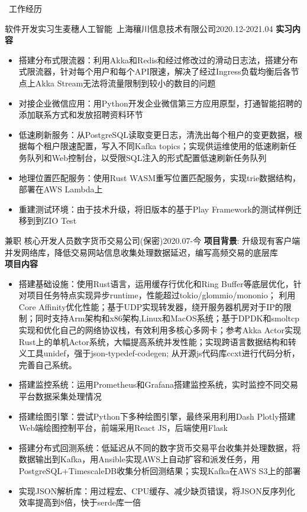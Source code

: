 \documentclass[UTF8]{resume}
\begin{document}
\begin{rSection}{\faBriefcase~工作经历}
    \begin{rExperience}{软件开发实习生}{麦穗人工智能~上海穰川信息技术有限公司}{2020.12-2021.04}
        \textbf{实习内容}
        \begin{itemize}
            \itemsep -0.5em \vspace{-0.5em}
            \item 搭建分布式限流器：利用Akka和Redis和经过修改过的滑动日志法，搭建分布式限流器，针对每个用户和每个API限速，解决了经过Ingress负载均衡后各节点上Akka Stream无法将流量限制到较小的数目的问题
            \item 对接企业微信应用：用Python开发企业微信第三方应用原型，打通智能招聘的添加联系方式和发放招聘资料环节
            \item 低速刷新服务：从PostgreSQL读取变更日志，清洗出每个租户的变更数据，根据每个租户限速配置，写入不同Kafka topics；实现供运维使用的低速刷新任务队列和Web控制台，以受限SQL注入的形式配置低速刷新任务队列
            \item 地理位置匹配服务：使用Rust WASM重写位置匹配服务，实现trie数据结构，部署在AWS Lambda上
            \item 重建测试环境：由于技术升级，将旧版本的基于Play Framework的测试样例迁移到到ZIO Test
        \end{itemize}
    \end{rExperience}
    \begin{rExperience}{兼职 核心开发人员}{数字货币交易公司(保密)}{2020.07-今}
        \textbf{项目背景}:
        升级现有客户端并发网络库，降低交易网站信息收集处理数据延迟，编写高频交易的底层库\\
        \textbf{项目内容}
        \begin{itemize}
            \itemsep -0.5em \vspace{-0.5em}
            \item 搭建基础设施：使用Rust语言，运用缓存行优化和Ring Buffer等底层优化，针对项目任务特点实现异步runtime，性能超过tokio/glommio/mononio； 利用Core Affinity优化性能；基于UDP实现转发器，绕开服务器机房对于IP的限制；同时支持Arm架构和x86架构,Linux和MacOS系统；基于DPDK和smoltcp实现和优化自己的网络协议栈，有效利用多核心多网卡；参考Akka Actor实现Rust上的单机Actor系统，大幅提高系统并发性能；实现跨语言数据结构和转义工具unidef，强于json-typedef-codegen; 从开源js代码库ccxt进行代码分析，完善自己系统。
            \item 搭建监控系统：运用Prometheus和Grafana搭建监控系统，实时监控不同交易平台数据采集处理情况
            \item 搭建绘图引擎：尝试Python下多种绘图引擎，最终采用利用Dash Plotly搭建Web端绘图控制平台，前端采用React JS，后端使用Flask
            \item 搭建分布式回测系统：低延迟从不同的数字货币交易平台收集并处理数据，将数据输出到Kafka，用Ansible实现AWS上自动扩容和派发任务，用PostgreSQL+TimescaleDB收集分析回测结果；实现Kafka在AWS S3上的部署
            \item 实现JSON解析库：用过程宏、CPU缓存、减少缺页错误，将JSON反序列化效率提高到8倍，快于serde库一倍 
        \end{itemize}
    \end{rExperience}
\end{rSection}
\end{document}
